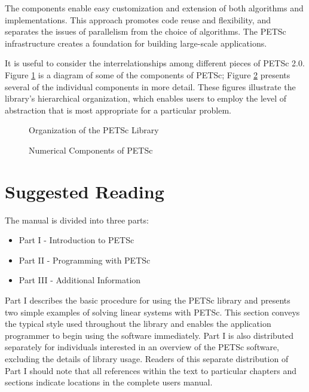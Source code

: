 The components enable easy customization and extension of both algorithms
and implementations.  This approach promotes code reuse and
flexibility, and separates the issues of parallelism from the choice
of algorithms.  The PETSc infrastructure creates a
foundation for building large-scale applications.

It is useful to consider the interrelationships among different
pieces of PETSc 2.0.  Figure \ref{fig:1} is a diagram of some 
of the components of PETSc; Figure \ref{fig:2} presents
several of the individual components in more detail.
These figures illustrate the library's hierarchical organization,
which enables users to employ the level of abstraction that is most 
appropriate for a particular problem.  
\begin{figure}[hbt]
\centerline{}
\caption{Organization of the PETSc Library}
\label{fig:1}
\end{figure}

\begin{figure}[hbt]
\centerline{}
\caption{Numerical Components of PETSc}
\label{fig:2}
\end{figure}

\section{Suggested Reading}

The manual is
divided into three parts:
\begin{itemize}
\item Part I - Introduction to PETSc
\item Part II - Programming with PETSc
\item Part III - Additional Information
\end{itemize}

Part I describes
the basic procedure for using the PETSc library and presents two
simple examples of solving linear systems with PETSc.  This section
conveys the typical style used throughout the library and enables the
application programmer to begin using the software immediately.
Part I is also distributed separately for individuals interested in an 
overview of the PETSc software, excluding the details of library usage.
Readers of this separate distribution of Part I should note that all
references within the text to particular chapters and sections 
indicate locations in the complete users manual.

